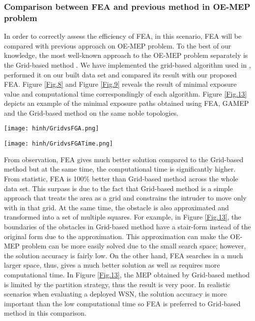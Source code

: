 \documentclass[final]{elsarticle}
\begin{document}
\subsubsection{Comparison between FEA and previous method in OE-MEP problem}
In order to correctly assess the efficiency of FEA, in this scenario, FEA will be compared with previous approach on OE-MEP problem. To the best of our knowledge, the most well-known approach to the OE-MEP problem separately is the Grid-based method \cite{liu2017obstacle}. We have implemented the grid-based algorithm used in \cite{liu2017obstacle}, performed it on our built data set and compared its result with our proposed FEA. Figure \ref{Fig.8} and Figure \ref{Fig.9} reveals the result of minimal exposure value and computational time correspondingly of each algorithm. Figure \ref{Fig.13} depicts an example of the minimal exposure paths obtained using FEA, GAMEP \cite{binh2019efficient} and the Grid-based method on the same noble topologies. 
\begin{figure*}[h]
	\texttt{[image: hinh/GridvsFGA.png]}
	\centering
	\caption{The minimal exposure value comparison between FEA and Grid based method on some noble topologies
	}
	\label{Fig.8}       %
\end{figure*}
\begin{figure*}[h]
	\texttt{[image: hinh/GridvsFGATime.png]}
	\centering
	\caption{The computational time (sec) comparison between FEA and Grid based method on some noble topologies
	}
	\label{Fig.9}       %
\end{figure*}

From observation, FEA gives much better solution compared to the Grid-based method but at the same time, the computational time is significantly higher. From statistic, FEA is 100\% better than Grid-based method across the whole data set. This surpass is due to the fact that Grid-based method is a simple approach that treats the area as a grid and constrains the intruder to move only  with in that grid. At the same time, the obstacle is also approximated and transformed into a set of multiple squares. For example, in Figure \ref{Fig.13}, the boundaries of the obstacles in Grid-based method have a stair-form instead of the original form due to the approximation. This approximation can make the OE-MEP problem can be more easily solved due to the small search space; however, the solution accuracy is fairly low. On the other hand, FEA searches in a much larger space, thus, gives a much better solution as well as requires more computational time. In Figure \ref{Fig.13}, the MEP obtained by Grid-based method is limited by the partition strategy, thus the result is very poor. In realistic scenarios when evaluating a deployed WSN, the solution accuracy is more important than the low computational time so FEA is preferred to Grid-based method in this comparison. 
\end{document}
